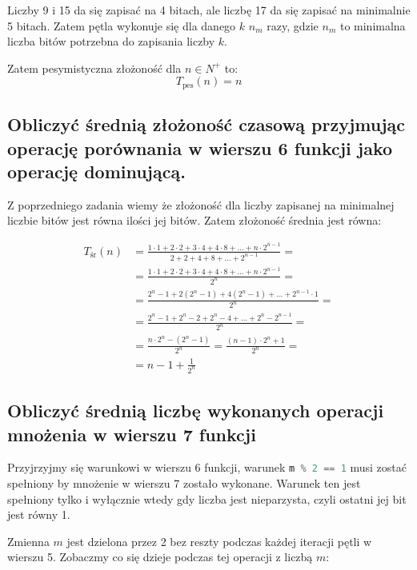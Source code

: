\documentclass[a4paper,12pt]{article}
\begin{document}
Liczby 9 i 15 da się zapisać na 4 bitach, ale liczbę 17 da się zapisać na minimalnie 5 bitach. Zatem pętla wykonuje
się dla danego $k$ $n_m$ razy, gdzie $n_m$ to minimalna liczba bitów potrzebna do zapisania liczby $k$. 

Zatem pesymistyczna złożoność dla $n \in N^+$ to:
\[T_\text{pes}(n) = n\]

\subsection{Obliczyć średnią złożoność czasową przyjmując operację porównania w wierszu 6
funkcji jako operację dominującą.}

Z poprzedniego zadania wiemy że złożoność dla liczby zapisanej na minimalnej liczbie bitów jest
równa ilości jej bitów. Zatem złożoność średnia jest równa:

\begin{align*}
 T_\text{śr}(n) &= \frac{1 \cdot 1 + 2\cdot2 + 3 \cdot 4 + 4 \cdot 8 + \dots + n\cdot2^{n -  1}}{2 + 2 + 4 + 8 + \dots +
 2^{n - 1}} = \\
 &= \frac{1 \cdot 1 + 2\cdot2 + 3 \cdot 4 + 4 \cdot 8 + \dots + n\cdot2^{n -  1}}{2^n} = \\
 &= \frac{2^n - 1 + 2\left(2^n-1\right) + 4 \left( 2^n-1 \right) + \dots + 2^{n-1}\cdot 1}{2^n} = \\
 &= \frac{2^n - 1 + 2^n - 2 + 2^n - 4 + \dots + 2^n - 2^{n-1}}{2^n} =  \\
 &= \frac{n\cdot2^n - \left(2^n -1\right)}{2^n} = \frac{\left(n-1\right)\cdot2^n + 1}{2^n} =\\
 &= n-1 + \frac{1}{2^n}
\end{align*}

\subsection{Obliczyć średnią liczbę wykonanych operacji mnożenia w wierszu 7 funkcji}

Przyjrzyjmy się warunkowi w wierszu 6 funkcji, warunek \lstinline[language = python]!m % 2 == 1! musi zostać spełniony by
mnożenie w wierszu 7 zostało wykonane. Warunek ten jest spełniony tylko i wyłącznie wtedy gdy liczba jest nieparzysta,
czyli ostatni jej bit jest równy 1.

Zmienna $m$ jest dzielona przez 2 bez reszty podczas każdej iteracji pętli w wierszu 5. Zobaczmy co się dzieje podczas tej
operacji z liczbą $m$:
\end{document}

